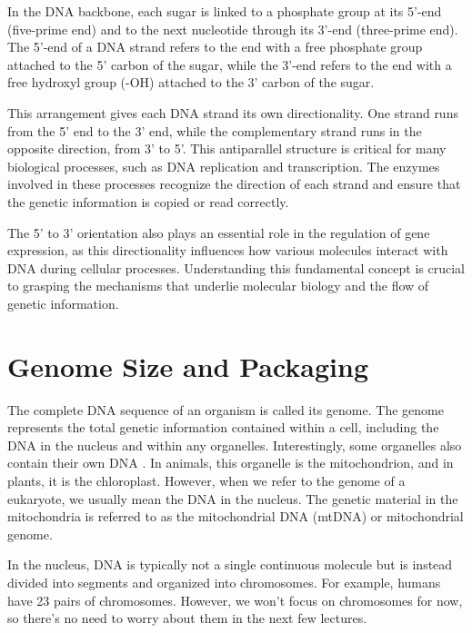 In the DNA backbone, each sugar is linked to a phosphate group at its 5'-end (five-prime end) and to the next nucleotide through its 3'-end (three-prime end). The 5'-end of a DNA strand refers to the end with a free phosphate group attached to the 5' carbon of the sugar, while the 3'-end refers to the end with a free hydroxyl group (-OH) attached to the 3' carbon of the sugar.

This arrangement gives each DNA strand its own directionality. One strand runs from the 5' end to the 3' end, while the complementary strand runs in the opposite direction, from 3' to 5'. This antiparallel structure is critical for many biological processes, such as DNA replication and transcription. The enzymes involved in these processes recognize the direction of each strand and ensure that the genetic information is copied or read correctly.

The 5' to 3' orientation also plays an essential role in the regulation of gene expression, as this directionality influences how various molecules interact with DNA during cellular processes. Understanding this fundamental concept is crucial to grasping the mechanisms that underlie molecular biology and the flow of genetic information.

\section{Genome Size and Packaging}

The complete DNA sequence of an organism is called its genome. The genome represents the total genetic information contained within a cell, including the DNA in the nucleus and within any organelles. Interestingly, some organelles also contain their own DNA
. In animals, this organelle is the mitochondrion, and in plants, it is the chloroplast. However, when we refer to the genome of a eukaryote, we usually mean the DNA in the nucleus. The genetic material in the mitochondria is referred to as the mitochondrial DNA (mtDNA) or mitochondrial genome.

In the nucleus, DNA is typically not a single continuous molecule but is instead divided into segments and organized into chromosomes. For example, humans have 23 pairs of chromosomes. However, we won't focus on chromosomes for now, so there's no need to worry about them in the next few lectures.

